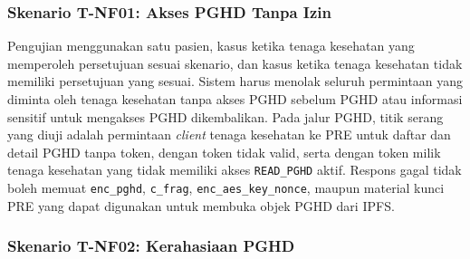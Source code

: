 
\subsubsection{Skenario T-NF01: Akses PGHD Tanpa Izin}

Pengujian menggunakan satu pasien, kasus ketika tenaga kesehatan yang memperoleh persetujuan sesuai skenario, dan kasus ketika tenaga kesehatan tidak memiliki persetujuan yang sesuai.
Sistem harus menolak seluruh permintaan yang diminta oleh tenaga kesehatan tanpa akses PGHD sebelum PGHD atau informasi sensitif untuk mengakses PGHD dikembalikan.
Pada jalur PGHD, titik serang yang diuji adalah permintaan \textit{client} tenaga kesehatan ke PRE untuk daftar dan detail PGHD tanpa token, dengan token tidak valid, serta dengan token milik tenaga kesehatan yang tidak memiliki akses \texttt{READ\_PGHD} aktif.
Respons gagal tidak boleh memuat \texttt{enc\_pghd}, \texttt{c\_frag}, \texttt{enc\_aes\_key\_nonce}, maupun material kunci PRE yang dapat digunakan untuk membuka objek PGHD dari IPFS\@.


\subsubsection{Skenario T-NF02: Kerahasiaan PGHD}

